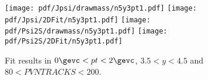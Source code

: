 \begin{figure}[H]
\begin{center}
\texttt{[image: pdf/Jpsi/drawmass/n5y3pt1.pdf]}
\texttt{[image: pdf/Jpsi/2DFit/n5y3pt1.pdf]}
\vspace*{-0.5cm}
\texttt{[image: pdf/Psi2S/drawmass/n5y3pt1.pdf]}
\texttt{[image: pdf/Psi2S/2DFit/n5y3pt1.pdf]}
\vspace*{-0.5cm}
\end{center}
\caption{Fit results in $0\gevc<pt<2\gevc$, $3.5<y<4.5$ and $80<PVNTRACKS<200$.}
\label{Fitn5y3pt1}
\end{figure}
